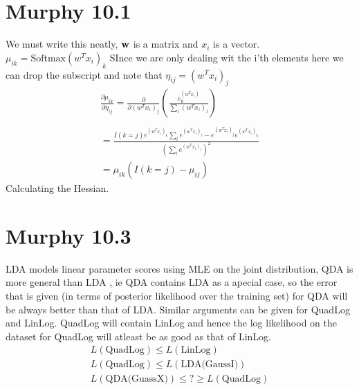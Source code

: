 \section{Murphy 10.1}
We must write this neatly, $\vb{w}$ is a matrix and $x_i $ is a vector.
$\mu_{ik} = \text{Softmax}(w^T x_i)_k$ SInce we are only dealing wit the i'th elements here
we can drop the subscript and note that $\eta_{ij} = (w^Tx_i)_j$
\begin{align}
    \frac{\partial \mu_{ik}}{\partial \eta_{ij} } = \frac{\partial}{\partial (w^Tx_i)_j } (\frac{e^(w^Tx_i)_k}{\sum_l (w^Tx_i)_l}) \\ \\
    = \frac{I(k = j)e^{(w^Tx_i)_k}\sum_l e^{(w^Tx_i)_l} - e^{(w^Tx_i)_j}e^{(w^Tx_i)_k}}{(\sum_l e^{(w^Tx_i)_l})^2} \\ 
    = \mu_{ik} (I( k = j) - \mu_{ij})
\end{align}
Calculating the Hessian.


\section{Murphy 10.3}
LDA models linear parameter scores using MLE on the joint distribution, QDA is more general than
LDA , ie QDA contains LDA as a apecial case, so the error that is given (in terms of posterior likelihood over the training set)
for QDA will be always better than that of LDA. Similar arguments can be given for QuadLog and LinLog. QuadLog will contain LinLog and
hence the log likelihood on the dataset for QuadLog will atleast be as good as that of LinLog.
\begin{gather}
    L(\text{QuadLog}) \le L(\text{LinLog}) \\
    L(\text{QuadLog}) \le L(\text{LDA(GaussI)}) \\
    L(\text{QDA(GuassX)}) \le  ? \ge L(\text{QuadLog}) \\
\end{gather}


% 